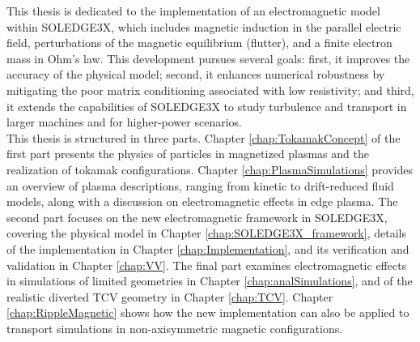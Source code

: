 This thesis is dedicated to the implementation of an electromagnetic model within SOLEDGE3X, which includes magnetic induction in the parallel electric field, perturbations of the magnetic equilibrium (flutter), and a finite electron mass in Ohm's law. This development pursues several goals: first, it improves the accuracy of the physical model; second, it enhances numerical robustness by mitigating the poor matrix conditioning associated with low resistivity; and third, it extends the capabilities of SOLEDGE3X to study turbulence and transport in larger machines and for higher-power scenarios. \\

This thesis is structured in three parts. Chapter \ref{chap:TokamakConcept} of the first part presents the physics of particles in magnetized plasmas and the realization of tokamak configurations. Chapter \ref{chap:PlasmaSimulations} provides an overview of plasma descriptions, ranging from kinetic to drift-reduced fluid models, along with a discussion on electromagnetic effects in edge plasma. The second part focuses on the new electromagnetic framework in SOLEDGE3X, covering the physical model in Chapter \ref{chap:SOLEDGE3X_framework}, details of the implementation in Chapter \ref{chap:Implementation}, and its verification and validation in Chapter \ref{chap:VV}. The final part examines electromagnetic effects in simulations of limited geometries in Chapter \ref{chap:analSimulations}, and of the realistic diverted TCV geometry in Chapter \ref{chap:TCV}. Chapter \ref{chap:RippleMagnetic} shows how the new implementation can also be applied to transport simulations in non-axisymmetric magnetic configurations.



